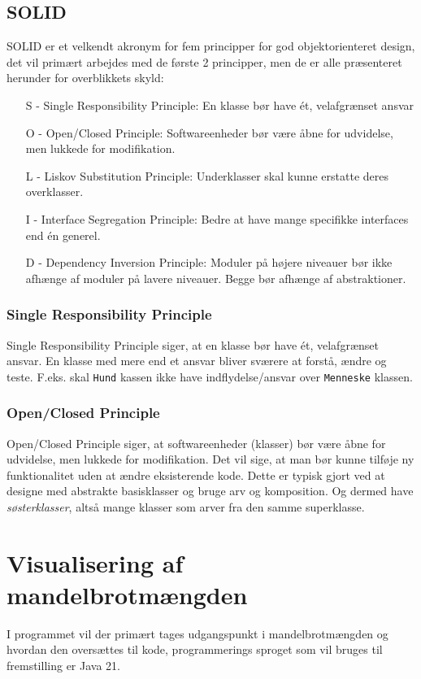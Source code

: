 \documentclass{article}
\begin{document}
\subsection{SOLID}
SOLID er et velkendt akronym for fem principper for god objektorienteret design, det vil primært arbejdes med de første 2 principper, men de er alle præsenteret herunder for overblikkets skyld:
\begin{itemize}
    \item[S -] Single Responsibility Principle: En klasse bør have ét, velafgrænset ansvar
    \item[O -] Open/Closed Principle: Softwareenheder bør være åbne for udvidelse, men lukkede for modifikation. 
    \item[L -] Liskov Substitution Principle: Underklasser skal kunne erstatte deres overklasser.
    \item[I -] Interface Segregation Principle: Bedre at have mange specifikke interfaces end én generel.
    \item[D -] Dependency Inversion Principle: Moduler på højere niveauer bør ikke afhænge af moduler på lavere niveauer. Begge bør afhænge af abstraktioner.
\end{itemize}
\subsubsection{Single Responsibility Principle}
Single Responsibility Principle siger, at en klasse bør have ét, velafgrænset ansvar. En klasse med mere end et ansvar bliver sværere at forstå, ændre og teste. F.eks. skal \texttt{Hund} kassen ikke have indflydelse/ansvar over \texttt{Menneske} klassen.
\subsubsection{Open/Closed Principle}
Open/Closed Principle siger, at softwareenheder (klasser) bør være åbne for udvidelse, men lukkede for modifikation. Det vil sige, at man bør kunne tilføje ny funktionalitet uden at ændre eksisterende kode. Dette er typisk gjort ved at designe med abstrakte basisklasser og bruge arv og komposition. Og dermed have \textit{søsterklasser}, altså mange klasser som arver fra den samme superklasse.
\section{Visualisering af mandelbrotmængden}
I programmet vil der primært tages udgangspunkt i mandelbrotmængden og hvordan den oversættes til kode, programmerings sproget som vil bruges til fremstilling er Java 21.
\end{document}
